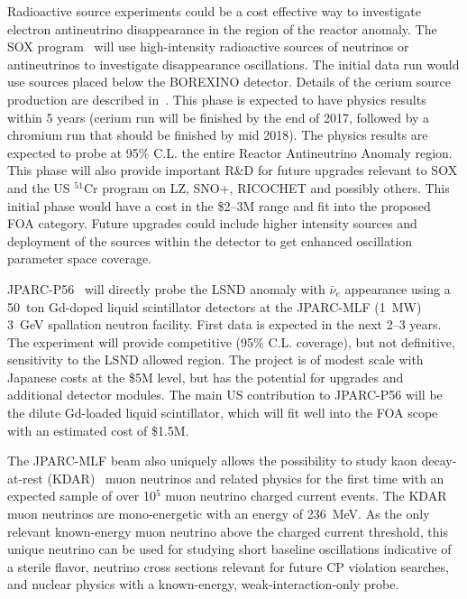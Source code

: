 \noindent Radioactive source experiments could be a cost effective way
to investigate electron antineutrino disappearance in the region of
the reactor anomaly. The SOX program~\cite{bib:SOX} will use
high-intensity radioactive sources of neutrinos or antineutrinos to
investigate disappearance oscillations. The initial data run would
use sources placed below the BOREXINO detector. Details of the cerium
source production are described in~\cite{bib:CL}. This phase is
expected to have physics results within 5 years (cerium run will be
finished by the end of 2017, followed by a chromium run that should be
finished by mid 2018). The physics results are expected to probe at
95\% C.L. the entire Reactor Antineutrino Anomaly region. This phase
will also provide important R\&D for future upgrades relevant to SOX
and the US $^{51}$Cr program on LZ, SNO+, RICOCHET and possibly
others. This initial phase would have a cost in
the \$2--3M range and fit into the proposed FOA category. 
Future upgrades could include higher intensity sources and deployment
of the sources within the detector to get enhanced oscillation
parameter space coverage.


\noindent JPARC-P56~\cite{JPARC_P_56} will directly probe the LSND
anomaly with $\bar\nu_e$ appearance using a 50~ton Gd-doped liquid
scintillator detectors at the JPARC-MLF (1~MW) 3~GeV spallation neutron
facility. First data is expected in the next 2--3 years. The
experiment will provide competitive (95\% C.L. coverage), but not
definitive, sensitivity to the LSND allowed region. The project is of
modest scale with Japanese costs at the \$5M level, but has the
potential for upgrades and additional detector modules. The main US
contribution to JPARC-P56 will be the dilute Gd-loaded liquid
scintillator, which will fit well into the FOA scope with an estimated
cost of \$1.5M.

The JPARC-MLF beam also uniquely allows the possibility to study kaon
decay-at-rest (KDAR)~\cite{KDAR} muon neutrinos 
and related physics for the first time with an expected sample of over 10$^5$ muon
neutrino charged current events. The KDAR muon neutrinos are
mono-energetic with an energy of 236~MeV. As the only relevant
known-energy muon neutrino above the charged current threshold, this
unique neutrino can be used for studying short baseline oscillations
indicative of a sterile flavor, neutrino cross sections relevant for
future CP violation searches, and nuclear physics with a known-energy,
weak-interaction-only probe.

